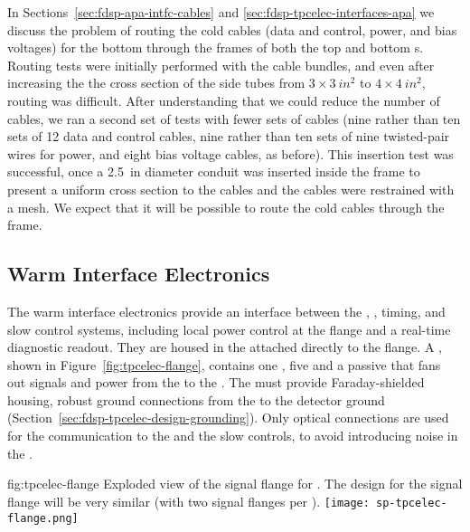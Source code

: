 In Sections~\ref{sec:fdsp-apa-intfc-cables} and \ref{sec:fdsp-tpcelec-interfaces-apa}
we discuss the problem of routing the cold cables (data and control, power, and 
bias voltages) for the bottom  through the frames of both
the top and bottom s. Routing tests were initially performed
with the  cable bundles, and even after increasing the 
the cross section of the side tubes from $\num{3}\times\SI{3}{in^2}$ 
to $\num{4}\times\SI{4}{in^2}$, routing was difficult. After understanding that we
could reduce the number of cables, we ran a second set of tests with fewer sets 
of cables (nine rather than ten sets of 12 data and control cables, nine rather than 
ten sets of nine twisted-pair wires for power, and eight bias voltage cables, as before).
This insertion test was successful, once
a \SI{2.5}{in} diameter conduit was inserted inside the 
 frame to present a uniform cross section to
the cables and the cables were restrained with a mesh. We expect that it will be possible
to route the cold cables through the  frame.

\subsection{Warm Interface Electronics}
\label{sec:fdsp-tpcelec-design-warm}

The warm interface electronics provide an interface between the 
, , timing, and slow control systems, including 
local power control at the flange and a real-time diagnostic readout. 
They are housed in the  attached directly to the  
flange.  %
A , shown in Figure~\ref{fig:tpcelec-flange}, 
contains one , %
 five %
 and a passive 
that fans out signals and  power from the  to the 
. The  must provide Faraday-shielded housing, 
robust ground connections from the  to the detector ground 
(Section~\ref{sec:fdsp-tpcelec-design-grounding}). Only optical
connections are used for the communication to the  and the
slow controls, to avoid introducing noise in the  \fdth.

\begin{dunefigure}
{fig:tpcelec-flange}
{Exploded view of the  signal flange for .  
The design for the   
signal flange will be very similar (with two  signal flanges per \fdth).}
\texttt{[image: sp-tpcelec-flange.png]}
\end{dunefigure}


